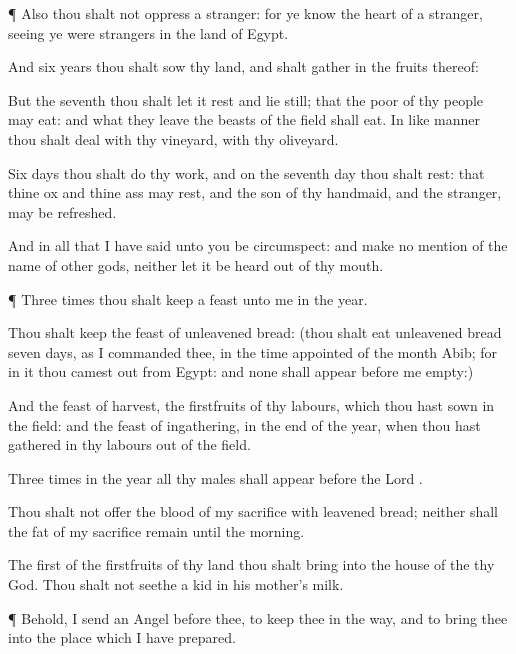 {\par }{\PP {}¶ Also thou shalt not
oppress a
stranger: for ye
know the
heart of a
stranger,
seeing ye were
strangers in the
land of
Egypt.


\par }{\PP {}And
six
years thou shalt
sow thy
land, and shalt
gather in the
fruits thereof:

But the
seventh
{} thou shalt let it
rest and
lie still; that the
poor of thy
people may
eat: and what they
leave the
beasts of the
field shall
eat. In like manner thou shalt
deal with thy
vineyard,
{} with thy
oliveyard.

Six
days thou shalt
do thy
work, and on the
seventh
day thou shalt
rest: that thine
ox and thine
ass may
rest, and the
son of thy
handmaid, and the
stranger, may be
refreshed.

And in all
{} that I have
said unto you be
circumspect: and make no
mention of the
name of
other
gods, neither let it be
heard
out of thy
mouth.


\par }{\PP {}¶
Three
times thou shalt keep a
feast unto me in the
year.

Thou shalt
keep the
feast of unleavened
bread: (thou shalt
eat unleavened
bread
seven
days, as I
commanded thee, in the time
appointed of the
month
Abib; for in it thou camest
out from
Egypt: and none shall
appear
before me
empty:)

And the
feast of
harvest, the
firstfruits of thy
labours, which thou hast
sown in the
field: and the
feast of
ingathering,
{} in the
end of the
year, when thou hast
gathered in thy
labours out of the
field.

Three
times in the
year all thy
males shall
appear
before the
Lord
{}.

Thou shalt not
offer the
blood of my
sacrifice with leavened
bread; neither shall the
fat of my
sacrifice
remain until the
morning.

The
first of the
firstfruits of thy
land thou shalt
bring into the
house of the
{} thy
God. Thou shalt not
seethe a
kid in his
mother’s
milk.


\par }{\PP {}¶ Behold, I
send an
Angel
before thee, to
keep thee in the
way, and to
bring thee into the
place which I have
prepared.

}

